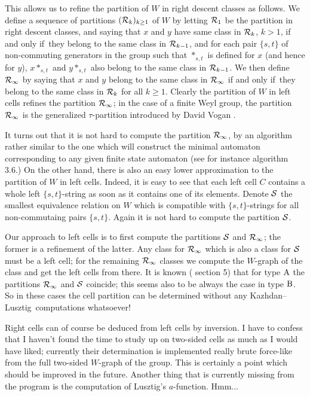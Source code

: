 \documentclass[11pt]{article}
\renewcommand{\iff}{if and only if}
\newcommand{\kl}{Kazh\-dan--Lusz\-tig}
\newcommand{\Rc}{{\cal R}}
\newcommand{\Sc}{{\cal S}}
\begin{document}
This allows us to refine the partition of $W$ in right descent classes as
follows. We define a sequence of partitions $(\Rc_k)_{k\geq 1}$ of $W$ by
letting $\Rc_1$ be the partition in right descent classes, and saying that
$x$ and $y$ have same class in $\Rc_k$, $k>1$, \iff\ they belong to the same
class in $\Rc_{k-1}$, and for each pair $\{s,t\}$ of non-commuting generators
in the group such that $*_{s,t}$ is defined for $x$ (and hence for $y$),
$x*_{s,t}$ and $y*_{s,t}$ also belong to the same class in $\Rc_{k-1}$. We
then define $\Rc_\infty$ by saying that $x$ and $y$ belong to the same class
in $\Rc_\infty$ \iff\ they belong to the same class in $\Rc_k$ for all
$k\geq1$. Clearly the partition of $W$ in left cells refines the partition
$\Rc_\infty$; in the case of a finite Weyl group, the partition $\Rc_\infty$ is
the generalized $\tau$-partition introduced by David Vogan \cite{vogan:1979}.

It turns out that it is not hard to compute the partition $\Rc_\infty$, by
an algorithm rather similar to the one which will construct the minimal
automaton corresponding to any given finite state automaton (see for
instance \cite{aho_seti_ullman:1986} algorithm 3.6.) On the other hand,
there is also an easy lower approximation to the partition of $W$ in left
cells. Indeed, it is easy to see that each left cell $C$ contains a whole left
$\{s,t\}$-string as soon as it contains one of its elements. Denote $\Sc$ the
smallest equivalence relation on $W$ which is compatible with $\{s,t\}$-strings
for all non-commutaing pairs $\{s,t\}$. Again it is not hard to compute the
partition $\Sc$.

Our approach to left cells is to first compute the partitions $\Sc$ and
$\Rc_\infty$; the former is a refinement of the latter. Any class for
$\Rc_\infty$ which is also a class for $\Sc$ must be a left cell; for the
remaining $\Rc_\infty$ classes we compute the $W$-graph of the class and
get the left cells from there. It is known (\cite{kl:1979} section 5) that
for type ${\rm A}$ the partitions $\Rc_\infty$ and $\Sc$ coincide; this seems
also to be always the case in type ${\rm B}$. So in these cases the cell
partition can be determined without any \kl\ computations whatsoever!

Right cells can of course be deduced from left cells by inversion. I have to
confess that I haven't found the time to study up on two-sided cells as much
as I would have liked; currently their determination is implemented really
brute force-like from the full two-sided $W$-graph of the group. This is
certainly a point which should be improved in the future. Another thing that
is currently missing from the program is the computation of Lusztig's
$a$-function. Hmm...
\end{document}
